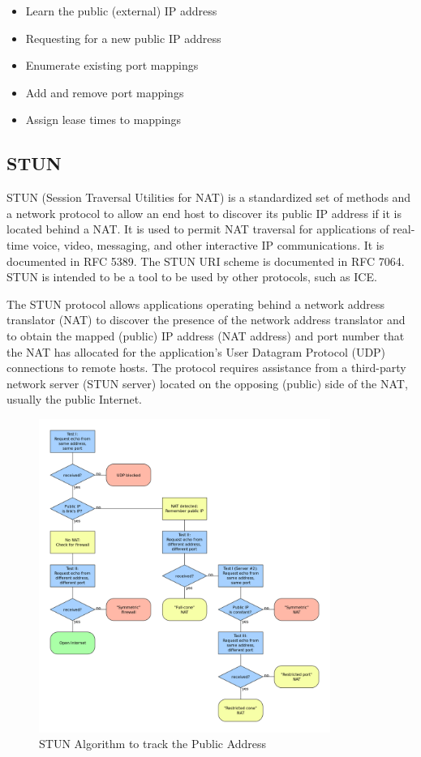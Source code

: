 \begin{itemize}
  \item Learn the public (external) IP address
  \item Requesting for a new public IP address\cite{srisuresh1999ip}
  \item Enumerate existing port mappings
  \item Add and remove port mappings
  \item Assign lease times to mappings
\end{itemize}
\subsection{STUN}
STUN (Session Traversal Utilities for NAT) is a standardized set of methods and a network protocol to allow an end host to discover its public IP address if it is located behind a NAT. It is used to permit NAT traversal for applications of real-time voice, video, messaging, and other interactive IP communications. It is documented in RFC 5389\cite{rosenberg2008rfc}. The STUN URI scheme is documented in RFC 7064. STUN is intended to be a tool to be used by other protocols, such as ICE.

The STUN protocol allows applications operating behind a network address translator (NAT) to discover the presence of the network address translator and to obtain the mapped (public) IP address (NAT address) and port number that the NAT has allocated for the application's User Datagram Protocol (UDP) connections to remote hosts. The protocol requires assistance from a third-party network server (STUN server) located on the opposing (public) side of the NAT, usually the public Internet.


\begin{figure}[htbp]
	\centering
		\includegraphics[width=9.5cm]{Figures/STUN_Algorithm.png}
	\caption[STUN Algorithm to track the Public Address]{STUN Algorithm to track the Public Address}
	\label{fig:stunalgorithm}
\end{figure}
